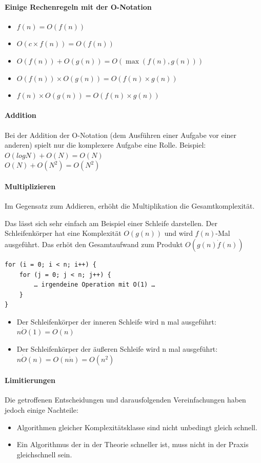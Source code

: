\documentclass{book}
\begin{document}
\paragraph{Einige Rechenregeln mit der O-Notation}
\begin{itemize}
	\item $f(n) = O(f(n))$
	\item $O(c \times f(n)) = O(f(n))$
	\item $O(f(n)) + O(g(n)) = O(\max(f(n), g(n)))$
	\item $O(f(n)) \times O(g(n)) = O(f(n) \times g(n))$
	\item $f(n) \times O(g(n)) = O(f(n) \times g(n))$
\end{itemize}
\paragraph{Addition}
Bei der Addition der O-Notation (dem Ausführen einer Aufgabe vor einer anderen) spielt nur die komplexere Aufgabe eine Rolle.
Beispiel: \\
$O(log N) + O(N) = O(N)$\\
$O(N) + O(N^{2}) = O(N^{2})$

\paragraph{Multiplizieren}
Im Gegensatz zum Addieren, erhöht die Multiplikation die Gesamtkomplexität.
\begin{tcolorbox}
	Das lässt sich sehr einfach am Beispiel einer Schleife darstellen.
Der Schleifenkörper hat eine Komplexität $O(g(n))$ und wird $f(n)$-Mal ausgeführt.
Das erhöt den Gesamtaufwand zum Produkt $O(g(n) \dot f(n))$
\begin{Verbatim}
for (i = 0; i < n; i++) {
	for (j = 0; j < n; j++) {
		… irgendeine Operation mit O(1) …
	}
}
\end{Verbatim}
\begin{itemize}
	\item Der Schleifenkörper der inneren Schleife wird n mal ausgeführt: $n \dot O(1) = O(n)$
	\item Der Schleifenkörper der äußeren Schleife wird n mal ausgeführt: $n \dot O(n) = O(n \dot n) = O(n^{2})$
\end{itemize}
\end{tcolorbox}

\paragraph{Limitierungen} Die getroffenen Entscheidungen und darausfolgenden Vereinfachungen haben jedoch einige Nachteile:
\begin{itemize}
	\item Algorithmen gleicher Komplexitätsklasse sind nicht unbedingt gleich schnell.
	\item Ein Algorithmus der in der Theorie schneller ist, muss nicht in der Praxis gleichschnell sein.
\end{itemize}
\end{document}
